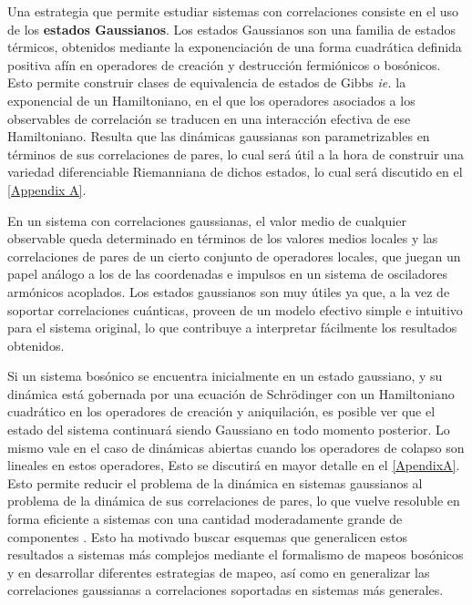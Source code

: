 \documentclass{report} %
\newcommand{\ie}{\textit{ie. }}
\numberwithin{equation}{section}
\begin{document}
Una estrategia que permite estudiar sistemas con correlaciones consiste en el uso de los \textbf{estados Gaussianos}. Los estados Gaussianos son una familia de estados térmicos, obtenidos mediante la exponenciación de una forma cuadrática definida positiva afín en operadores de creación y destrucción fermiónicos o bosónicos. Esto permite construir clases de equivalencia de estados de Gibbs \cite{PATHRIA2011115} \ie la exponencial de un Hamiltoniano, en el que los operadores asociados a los observables de correlación se traducen en una interacción efectiva de ese Hamiltoniano. Resulta que las dinámicas gaussianas son parametrizables en términos de sus correlaciones de pares, lo cual será útil a la hora de construir una variedad diferenciable Riemanniana \cite{NakaharaM} de dichos estados, lo cual será discutido en el \autoref{Appendix A}.

En un sistema con correlaciones gaussianas, el valor medio de cualquier observable queda determinado en términos de los valores medios locales y las correlaciones de pares de un cierto conjunto de operadores locales, que juegan un papel análogo a los de las coordenadas e impulsos en un sistema de osciladores armónicos acoplados. Los estados gaussianos son muy útiles ya que, a la vez de soportar correlaciones cuánticas,  proveen de un modelo efectivo simple e intuitivo para el sistema original, lo que contribuye a interpretar fácilmente los resultados obtenidos.

Si un sistema bosónico se encuentra inicialmente en un estado gaussiano, y su dinámica está gobernada por una ecuación de Schr\"odinger con un Hamiltoniano cuadrático en los operadores de creación y aniquilación, es posible ver que el estado del sistema continuará siendo Gaussiano en todo momento posterior. Lo mismo vale en el caso de dinámicas abiertas cuando los operadores de colapso son lineales en estos operadores, Esto se discutirá en mayor detalle en el \autoref{ApendixA}. Esto permite reducir el problema de la dinámica en sistemas gaussianos al problema de la dinámica de sus correlaciones de pares, lo que vuelve resoluble en forma eficiente a sistemas con una cantidad moderadamente grande de componentes \cite{Feynman1963,Illuminati2018}. Esto ha motivado buscar esquemas que generalicen estos resultados a sistemas más complejos mediante el formalismo de mapeos bosónicos y en desarrollar diferentes estrategias de mapeo, así como en generalizar las correlaciones gaussianas a correlaciones soportadas en sistemas más generales.
\end{document}
